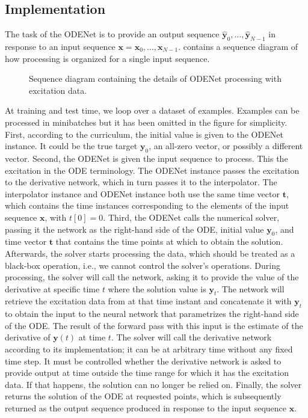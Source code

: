 \subsection{Implementation}
\label{subsec:odenet_implementation}

The task of the ODENet is to provide an output sequence $\hat{\pmb{y}}_0, \dots, \hat{\pmb{y}}_{N-1}$ in response to an input sequence $\pmb{x} = \pmb{x}_0, \dots, \pmb{x}_{N-1}$.  contains a sequence diagram of how processing is organized for a single input sequence.

\begin{figure}
  \centering
  \scalebox{0.9}{}
  \caption{Sequence diagram containing the details of ODENet processing with excitation data. }
  \label{fig:odenet_sequence_diagram}
\end{figure}

At training and test time, we loop over a dataset of examples. Examples can be processed in minibatches but it has been omitted in the figure for simplicity. First, according to the curriculum, the initial value is given to the ODENet instance. It could be the true target $\pmb{y}_0$, an all-zero vector, or possibly a different vector. Second, the ODENet is given the input sequence to process. This the excitation in the \ac{ODE} terminology. The ODENet instance passes the excitation to the derivative network, which in turn passes it to the interpolator. The interpolator instance and ODENet instance both use the same time vector $\pmb{t}$, which contains the time instances corresponding to the elements of the input sequence $\pmb{x}$, with $t[0]=0$. Third, the ODENet calls the numerical solver, passing it the network as the right-hand side of the \ac{ODE}, initial value $\pmb{y}_0$, and time vector $\pmb{t}$ that contains the time points at which to obtain the solution. Afterwards, the solver starts processing the data, which should be treated as a black-box operation, i.e., we cannot control the solver's operations. During processing, the solver will call the network, asking it to provide the value of the derivative at specific time $t$ where the solution value is $\pmb{y}_t$. The network will retrieve the excitation data from at that time instant and concatenate it with $\pmb{y}_t$ to obtain the input to the neural network that parametrizes the right-hand side of the \ac{ODE}. The result of the forward pass with this input is the estimate of the derivative of $\pmb{y}(t)$ at time $t$. The solver will call the derivative network according to its implementation; it can be at arbitrary time without any fixed time step. It must be controlled whether the derivative network is asked to provide output at time outside the time range for which it has the excitation data. If that happens, the solution can no longer be relied on. Finally, the solver returns the solution of the \ac{ODE} at requested points, which is subsequently returned as the output sequence produced in response to the input sequence $\pmb{x}$.

